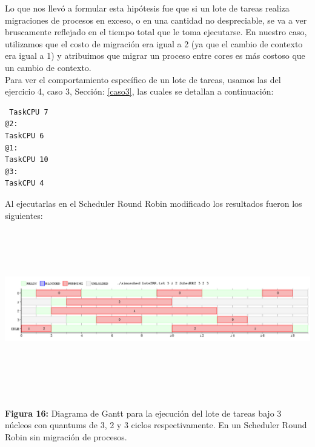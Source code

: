 \documentclass[a4paper]{article}
\begin{document}
Lo que nos llevó a formular esta hipótesis fue que si un lote de tareas realiza migraciones de procesos en exceso, o en una cantidad no despreciable, se va a ver bruscamente reflejado en el tiempo total que le toma ejecutarse. En nuestro caso, utilizamos que el costo de migración era igual a 2 (ya que el cambio de contexto era igual a 1) y atribuimos que migrar un proceso entre cores es m\'as costoso que un cambio de contexto.\\

 Para ver el comportamiento espec\'ifico de un lote de tareas, usamos las del ejercicio 4, caso 3, Secci\'on: \ref{caso3}, las cuales se detallan a continuaci\'on:


 \begin{codesnippet}
	\begin{verbatim}
 TaskCPU 7
@2:
TaskCPU 6
@1:
TaskCPU 10
@3:
TaskCPU 4
	\end{verbatim}
	\end{codesnippet}
	
Al ejecutarlas en el Scheduler Round Robin modificado los resultados fueron los siguientes:\\
	
\includegraphics[width=\textwidth,height=3.0in,keepaspectratio
]{imagenes/ej8/2eje4.png} \\
\begin {flushleft}
\textbf{Figura 16:} Diagrama de Gantt para la ejecuci\'on del lote de tareas bajo 3 n\'ucleos con quantums de 3, 2 y 3 ciclos respectivamente. En un Scheduler Round Robin sin migración de procesos.
\end{flushleft}	
	
\end{document}

